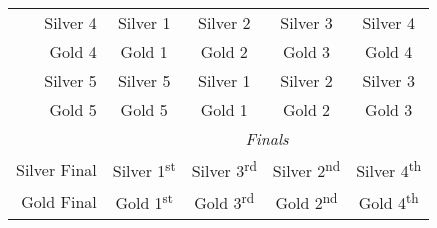 \begin{tabular}{r | c c c c}
    Silver 4 & Silver 1 & Silver 2 & Silver 3 & Silver 4 \\
    Gold 4 & Gold 1 & Gold 2 & Gold 3 & Gold 4 \\
    Silver 5 & Silver 5 & Silver 1 & Silver 2 & Silver 3 \\
    Gold 5 & Gold 5 & Gold 1 & Gold 2 & Gold 3 \\
    & \multicolumn{4}{|c}{\textit{Finals}} \\
    Silver Final & Silver 1\textsuperscript{st} & Silver 3\textsuperscript{rd} & Silver 2\textsuperscript{nd} & Silver 4\textsuperscript{th} \\
    Gold Final & Gold 1\textsuperscript{st} & Gold 3\textsuperscript{rd} & Gold 2\textsuperscript{nd} & Gold 4\textsuperscript{th} \\
\end{tabular}

